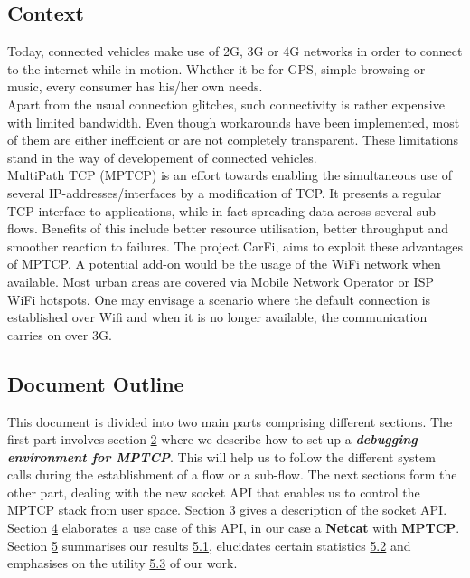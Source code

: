 \documentclass[a4paper,11pt]{article}
\begin{document}
		\subsection{Context}
			\begin{description}
				\item \hspace{2cm} Today, connected vehicles make use of 2G, 3G or 4G networks in order to connect to the internet while in motion. Whether it be for GPS, simple browsing or music, every consumer has his/her own needs. \\Apart from the usual connection glitches, such connectivity is rather expensive with limited bandwidth. Even though workarounds have been implemented, most of them are either inefficient or are not completely transparent. These limitations stand in the way of developement of connected vehicles. \\MultiPath TCP (MPTCP) is an effort towards enabling the simultaneous use of several IP-addresses/interfaces by a modification of TCP. It presents a regular TCP interface to applications, while in fact spreading data across several sub-flows. Benefits of this include better resource utilisation, better throughput and smoother reaction to failures. The project CarFi, aims to exploit these advantages of MPTCP. A potential add-on would be the usage of the WiFi network when available. Most urban areas are covered via Mobile Network Operator or ISP WiFi hotspots. One may envisage a scenario where the default connection is established over Wifi and when it is no longer available, the communication carries on over 3G.
			\end{description}
	
		\vspace{0.5cm}
		\subsection{Document Outline}
			\begin{description}
				\item \hspace{2cm} This document is divided into two main parts comprising different sections. The first part involves section \hyperref[sec:mptcpdebug]{2} where we describe how to set up a \textbf{\emph{debugging environment for MPTCP}}. This will help us to follow the different system calls during the establishment of a flow or a sub-flow. The next sections form the other part, dealing with the new socket API that enables us to control the MPTCP stack from user space. Section \hyperref[sec:mptcpapi]{3} gives a description of the socket API. Section \hyperref[sec:netcat-mptcp]{4} elaborates a use case of this API, in our case a \textbf{Netcat} with \textbf{MPTCP}. Section \hyperref[sec:res]{5} summarises our results \hyperref[subsec:result]{5.1}, elucidates certain statistics \hyperref[subsec:statistics]{5.2} and emphasises on the utility \hyperref[subsec:utility]{5.3} of our work.
			\end{description}
\end{document}
